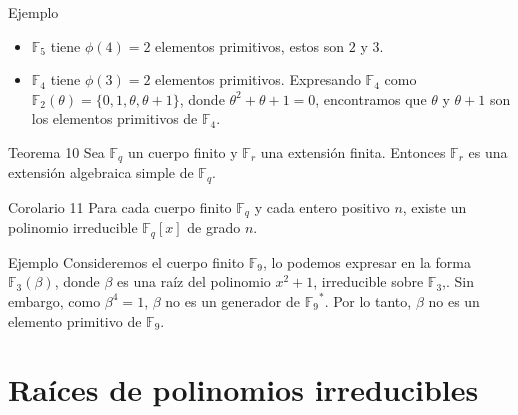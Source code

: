 \documentclass[presentation]{beamer}
\newcommand{\F}{\mathds{F}}
\begin{document}
\begin{frame}
  \begin{block}{Ejemplo}
    \begin{itemize}
      \item $\F_5$ tiene $\phi(4) = 2$ elementos primitivos, estos son $2$ y $3$.
      \pause
      \item $\F_4$ tiene $\phi(3) = 2$ elementos primitivos. Expresando $\F_4$ como $\F_2(\theta) = \{0, 1, \theta, \theta + 1\}$, donde $\theta^2 + \theta + 1 = 0$, encontramos que $\theta$ y $\theta + 1$ son los elementos primitivos de $\F_4$.
    \end{itemize}
  \end{block}
\end{frame}

\begin{frame}
  \begin{block}{Teorema 10}
    Sea $\F_q$ un cuerpo finito y $\F_r$ una extensión finita. Entonces $\F_r$ es una extensión algebraica simple de $\F_q$.
    
    \begin{figure}[H]
      \centering
    \end{figure}
  \end{block}
  \pause 
  \begin{block}{Corolario 11}
    Para cada cuerpo finito $\F_q$ y cada entero positivo $n$, existe un polinomio irreducible $ \F_q[x]$ de grado $n$.
  \end{block}
\end{frame}

\begin{frame}
  \begin{block}{Ejemplo}
    Consideremos el cuerpo finito $\F_9$, lo podemos expresar en la forma $\F_3(\beta)$, donde $\beta$ es una raíz del polinomio $x^2+1$, irreducible sobre $\F_3$,. Sin embargo, como $\beta^4 = 1$, $\beta$ no es un generador de ${\F_9}^*$. Por lo tanto, $\beta$ no es un elemento primitivo de $\F_9$.
  \end{block}
\end{frame}

\section{Raíces de polinomios irreducibles}
\end{document}
